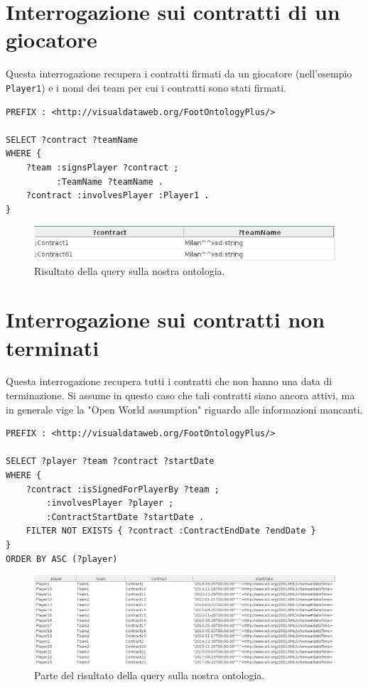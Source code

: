 \documentclass[11pt]{report} %
\begin{document}
\section{Interrogazione sui contratti di un giocatore}

Questa interrogazione recupera i contratti firmati da un giocatore (nell'esempio \texttt{Player1}) e i nomi dei team per cui i contratti sono stati firmati. 

\begin{lstlisting}
PREFIX : <http://visualdataweb.org/FootOntologyPlus/>

SELECT ?contract ?teamName
WHERE { 
    ?team :signsPlayer ?contract ;
          :TeamName ?teamName .
    ?contract :involvesPlayer :Player1 .
}
\end{lstlisting}

\begin{figure}[H]
	\includegraphics[width=\textwidth]{query1}
	\caption{Risultato della query sulla nostra ontologia.}
\end{figure}

\newpage

\section{Interrogazione sui contratti non terminati}

Questa interrogazione recupera tutti i contratti che non hanno una data di terminazione. Si assume in questo caso che tali contratti siano ancora attivi, ma in generale vige la "Open World assumption" riguardo alle informazioni mancanti.

\begin{lstlisting}
PREFIX : <http://visualdataweb.org/FootOntologyPlus/>

SELECT ?player ?team ?contract ?startDate
WHERE { 
    ?contract :isSignedForPlayerBy ?team ;
        :involvesPlayer ?player ;
        :ContractStartDate ?startDate .
    FILTER NOT EXISTS { ?contract :ContractEndDate ?endDate }
}
ORDER BY ASC (?player)
\end{lstlisting}

\begin{figure}[H]
	\includegraphics[width=\textwidth]{query2}
	\caption{Parte del risultato della query sulla nostra ontologia.}
\end{figure}
\end{document}
